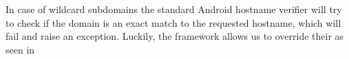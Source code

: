 In case of wildcard subdomains the standard Android hostname verifier will try to check if the domain is an exact match to the requested hostname, which will fail and raise an exception. Luckily, the framework allows us to override their  as seen in 






